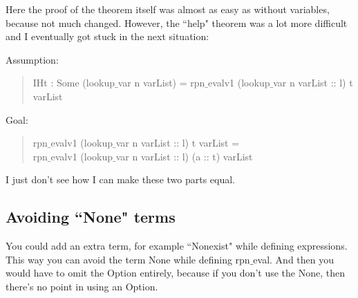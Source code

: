 \documentclass[paper=a4, fontsize=11pt]{scrartcl} %
\numberwithin{equation}{section} %
\numberwithin{figure}{section} %
\numberwithin{table}{section} %
\begin{document}
Here the proof of the theorem itself was almost as easy as without variables, because not much changed. 
However, the ``help" theorem was a lot more difficult and I eventually got stuck in the next situation: 

Assumption: 
\begin{quote}
IHt : Some (lookup$\_$var n varList) = rpn$\_$evalv1 (lookup$\_$var n varList :: l) t varList
\end{quote}

Goal: 
\begin{quote}
rpn$\_$evalv1 (lookup$\_$var n varList :: l) t varList = \\rpn$\_$evalv1 (lookup$\_$var n varList :: l) (a :: t) varList
\end{quote}

I just don't see how I can make these two parts equal.

\subsection{Avoiding ``None" terms}
You could add an extra term, for example ``Nonexist" while defining expressions. This way you can avoid the term None while defining rpn$\_$eval. And then you would have to omit the Option entirely, because if you don't use the None, then there's no point in using an Option. 
\end{document}
